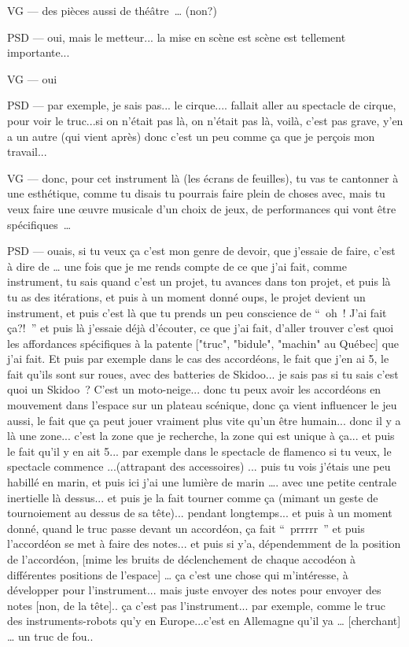 VG —  des pièces aussi de théâtre … (non?) 

PSD — oui, mais le metteur... la mise en scène est scène est tellement importante...  

VG —  oui 

PSD — par exemple, je sais pas... le cirque.... fallait aller au spectacle de cirque, pour voir le truc...si on n'était pas là, on n'était pas là, voilà, c'est pas grave, y'en a un autre (qui vient après) donc c'est un peu comme ça que je perçois mon travail...  

VG —  donc, pour cet instrument là (les écrans de feuilles), tu vas te cantonner à une esthétique, comme tu disais tu pourrais faire plein de choses avec, mais tu veux faire une œuvre musicale d'un choix de jeux, de performances qui vont être spécifiques … 

PSD — ouais, si tu veux ça c'est mon genre de devoir, que j'essaie de faire, c'est à dire de … une fois que je me rends compte de ce que j'ai fait, comme instrument, tu sais quand c'est un projet, tu avances dans ton projet, et puis là tu as des itérations, et puis à un moment donné oups, le projet devient un instrument, et puis c'est là que tu prends un peu conscience de “ oh ! J'ai fait ça?! ” et puis là j'essaie déjà d'écouter, ce que j'ai fait, d'aller trouver c'est quoi les affordances spécifiques à la patente ["truc", "bidule", "machin" au Québec] que j'ai fait. Et puis par exemple dans le cas des accordéons, le fait que j'en ai 5, le fait qu'ils sont sur roues, avec des batteries de Skidoo... je sais pas si tu sais c'est quoi un Skidoo ? C'est un moto-neige... donc tu peux avoir les accordéons en mouvement dans l'espace sur un plateau scénique, donc ça vient influencer le jeu aussi, le fait que ça peut jouer vraiment plus vite qu'un être humain... donc il y a là une zone... c'est la zone que je recherche, la zone qui est unique à ça... et puis le fait qu'il y en ait 5... par exemple dans le spectacle de flamenco si tu veux, le spectacle commence ...(attrapant des accessoires) ... puis tu vois j'étais une peu habillé en marin, et puis ici j'ai une lumière de marin …. avec une petite centrale inertielle là dessus... et puis je la fait tourner comme ça (mimant un geste de tournoiement au dessus de sa tête)... pendant longtemps... et puis à un moment donné, quand le truc passe devant un accordéon, ça fait “ prrrrr ” et puis l'accordéon se met à faire des notes... et puis si y'a, dépendemment de la position de l'accordéon, [mime les bruits de déclenchement de chaque accodéon à différentes positions de l'espace] … ça c'est une chose qui m'intéresse, à développer pour l'instrument... mais juste envoyer des notes pour envoyer des notes [non, de la tête].. ça c'est pas l'instrument... par exemple, comme le truc des instruments-robots qu'y en Europe...c'est en Allemagne qu'il ya  … [cherchant] … un truc de fou..  

